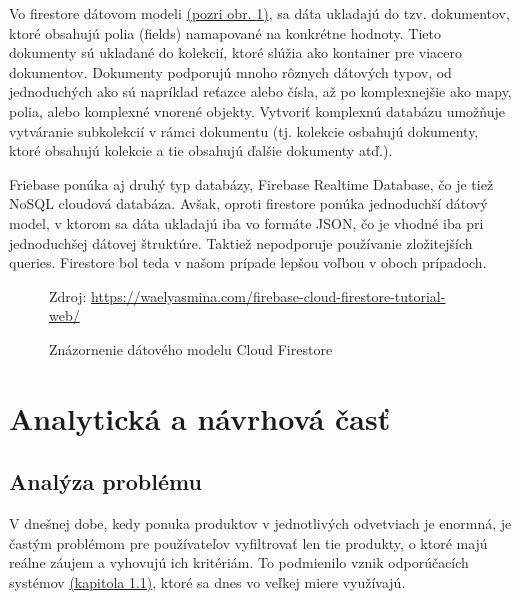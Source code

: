 Vo firestore dátovom modeli \hyperref[firestore]{(pozri obr. \ref{firestore})}, sa dáta ukladajú do tzv. dokumentov, ktoré obsahujú polia (fields) namapované na konkrétne hodnoty. Tieto dokumenty sú ukladané do kolekcií, ktoré slúžia ako kontainer pre viacero dokumentov. Dokumenty podporujú mnoho rôznych dátových typov, od jednoduchých ako sú napríklad reťazce alebo čísla, až po komplexnejšie ako mapy, polia, alebo komplexné vnorené objekty. Vytvoriť komplexnú databázu umožňuje vytváranie subkolekcií v rámci dokumentu (tj. kolekcie osbahujú dokumenty, ktoré obsahujú kolekcie a tie obsahujú ďalšie dokumenty atď.). \cite{firestoredoc}
  
Friebase ponúka aj druhý typ databázy, Firebase Realtime Database, čo je tiež NoSQL cloudová databáza. Avšak, oproti firestore ponúka jednoduchší dátový model, v ktorom sa dáta ukladajú iba vo formáte JSON, čo je vhodné iba pri jednoduchšej dátovej štruktúre. Taktiež nepodporuje používanie zložitejších queries. Firestore bol teda v našom prípade lepšou voľbou v oboch prípadoch. \\

\begin{figure}[!htbp]
  \centering  
  \def\stackalignment{c}
           {\scriptsize%
            Zdroj: \url{https://waelyasmina.com/firebase-cloud-firestore-tutorial-web/}}
	\caption{Znázornenie dátového modelu Cloud Firestore}  
  \label{firestore}
\end{figure}




\section{Analytická a návrhová časť}
\subsection{Analýza problému}
V dnešnej dobe, kedy ponuka produktov v jednotlivých odvetviach je enormná, je častým problémom pre používateľov vyfiltrovať len tie produkty, o ktoré majú reálne záujem a vyhovujú ich kritériám. To podmienilo vznik odporúčacích systémov \hyperref[sec:odporucacie systemy]{(kapitola 1.1)}, ktoré sa dnes vo veľkej miere využívajú. 

